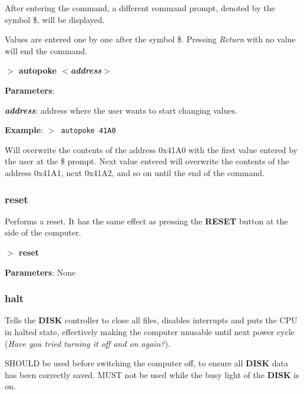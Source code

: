 \documentclass[a4paper,11pt]{article}
\begin{document}
        After entering the command, a different command prompt, denoted by
        the symbol \$, will be displayed.

        Values are entered one by one after the symbol \$. Pressing 
        \textit{Return} with no value will end the command.

        \hspace{1.9cm}\textbf{$>$ autopoke \textit{$<$address$>$}}

        \textbf{Parameters}:

        \hspace{1cm}\textbf{\textit{address}}: address where the user wants
        to start changing values.

        \textbf{Example}: \texttt{$>$ autopoke 41A0}

        Will overwrite the contents of the address 0x41A0 with the first
        value entered by the user at the \$ prompt. Next value entered will
        overwrite the contents of the address 0x41A1, next 0x41A2, and so on
        until the end of the command.

        \subsubsection{{\color{blue}reset}}
        Performs a reset. It has the same effect as pressing the
        \textbf{RESET} button at the side of the computer.

        \hspace{1.9cm}\textbf{$>$ reset}

        \textbf{Parameters}: None

        \subsubsection{{\color{blue}halt}}
        Tells the \textbf{DISK} controller to close all files, disables
        interrupts and puts the CPU in halted state, effectively making the
        computer unusable until next power cycle (\textit{Have you tried turning
        it off and on again?}).

        SHOULD be used before switching the computer off, to ensure all
        \textbf{DISK} data has been correctly saved. MUST not be used while the
        busy light of the \textbf{DISK} is on.
\end{document}
